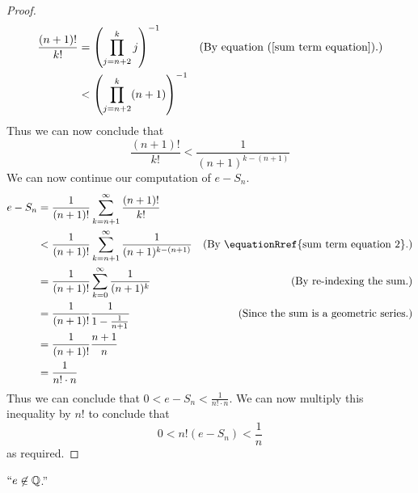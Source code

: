 \begin{proof}
\begin{align*}
                \frac{(n + 1)!}{k!} &= \left(\prod_{j = n + 2}^{k} j \right)^{-1}
                                    & \just{By \equationRef{sum term equation}.}
                                    &< \left(\prod_{j = n + 2}^{k} (n + 1) \right)^{-1}\\
            \end{align*}
            Thus we can now conclude that
            \begin{equation}
                \label{sum term equation 2}
                \frac{(n + 1)!}{k!} < \frac{1}{(n + 1)^{k - (n + 1)}}
            \end{equation}
            We can now continue our computation of $e - S_n$.
            \begin{align*}
                e - S_n &= \frac{1}{(n + 1)!} \sum_{k = n + 1}^{\infty} \frac{(n + 1)!}{k!} \\
                        &< \frac{1}{(n + 1)!} \sum_{k = n + 1}^{\infty} \frac{1}{(n + 1)^{k - (n + 1)}}
                        & \just{By \equationRref{sum term equation 2}.}
                        &= \frac{1}{(n + 1)!} \sum_{k = 0}^{\infty} \frac{1}{(n + 1)^{k}}
                        & \just{By re-indexing the sum.}
                        &= \frac{1}{(n + 1)!} \frac{1}{1 - \frac{1}{n + 1}}
                        & \just{Since the sum is a geometric series.}
                        &= \frac{1}{(n + 1)!} \frac{n + 1}{n} \\
                        &= \frac{1}{n! \cdot n}
            \end{align*}
            Thus we can conclude that $0 < e - S_n < \frac{1}{n! \cdot n}$. We can now multiply
            this inequality by $n!$ to conclude that
            \begin{equation}
                0 < n! (e - S_n) < \frac{1}{n}
            \end{equation}
            as required. \QED
        \end{proof}
        \begin{theorem}
            $``e \not\in \mathbb{Q}$.''
        \end{theorem}
